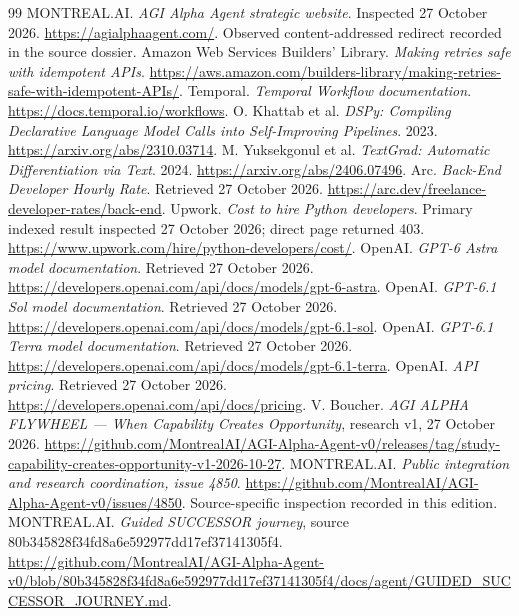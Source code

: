 \documentclass[11pt,letterpaper]{article}
\begin{document}
\begin{thebibliography}{99}\small
{} MONTREAL.AI. \emph{AGI Alpha Agent strategic website}. Inspected 27 October 2026. \url{https://agialphaagent.com/}. Observed content-addressed redirect recorded in the source dossier.
 Amazon Web Services Builders' Library. \emph{Making retries safe with idempotent APIs}. \url{https://aws.amazon.com/builders-library/making-retries-safe-with-idempotent-APIs/}.
 Temporal. \emph{Temporal Workflow documentation}. \url{https://docs.temporal.io/workflows}.
 O. Khattab et al. \emph{DSPy: Compiling Declarative Language Model Calls into Self-Improving Pipelines}. 2023. \url{https://arxiv.org/abs/2310.03714}.
 M. Yuksekgonul et al. \emph{TextGrad: Automatic Differentiation via Text}. 2024. \url{https://arxiv.org/abs/2406.07496}.
 Arc. \emph{Back-End Developer Hourly Rate}. Retrieved 27 October 2026. \url{https://arc.dev/freelance-developer-rates/back-end}.
 Upwork. \emph{Cost to hire Python developers}. Primary indexed result inspected 27 October 2026; direct page returned 403. \url{https://www.upwork.com/hire/python-developers/cost/}.
 OpenAI. \emph{GPT-6 Astra model documentation}. Retrieved 27 October 2026. \url{https://developers.openai.com/api/docs/models/gpt-6-astra}.
 OpenAI. \emph{GPT-6.1 Sol model documentation}. Retrieved 27 October 2026. \url{https://developers.openai.com/api/docs/models/gpt-6.1-sol}.
 OpenAI. \emph{GPT-6.1 Terra model documentation}. Retrieved 27 October 2026. \url{https://developers.openai.com/api/docs/models/gpt-6.1-terra}.
 OpenAI. \emph{API pricing}. Retrieved 27 October 2026. \url{https://developers.openai.com/api/docs/pricing}.
 V. Boucher. \emph{AGI ALPHA FLYWHEEL --- When Capability Creates Opportunity}, research v1, 27 October 2026. \url{https://github.com/MontrealAI/AGI-Alpha-Agent-v0/releases/tag/study-capability-creates-opportunity-v1-2026-10-27}.
 MONTREAL.AI. \emph{Public integration and research coordination, issue 4850}. \url{https://github.com/MontrealAI/AGI-Alpha-Agent-v0/issues/4850}. Source-specific inspection recorded in this edition.
 MONTREAL.AI. \emph{Guided SUCCESSOR journey}, source 80b345828f34fd8a6e592977dd17ef37141305f4. \url{https://github.com/MontrealAI/AGI-Alpha-Agent-v0/blob/80b345828f34fd8a6e592977dd17ef37141305f4/docs/agent/GUIDED_SUCCESSOR_JOURNEY.md}.
\end{thebibliography}
\end{document}
